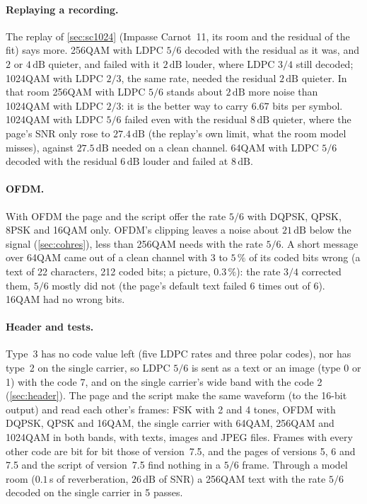 \documentclass[11pt,a4paper]{article}
\newcommand{\dB}{\,\mathrm{dB}}
\theoremstyle{remark}
\begin{document}
\paragraph{Replaying a recording.}
The replay of \cref{sec:sc1024} (Impasse Carnot~11, its room and the residual of the fit) says more. 256QAM with LDPC $5/6$ decoded with the residual as it was, and $2$ or $4\dB$ quieter, and failed with it $2\dB$ louder, where LDPC $3/4$ still decoded; 1024QAM with LDPC $2/3$, the same rate, needed the residual $2\dB$ quieter. In that room 256QAM with LDPC $5/6$ stands about $2\dB$ more noise than 1024QAM with LDPC $2/3$: it is the better way to carry $6.67$ bits per symbol. 1024QAM with LDPC $5/6$ failed even with the residual $8\dB$ quieter, where the page's SNR only rose to $27.4\dB$ (the replay's own limit, what the room model misses), against $27.5\dB$ needed on a clean channel. 64QAM with LDPC $5/6$ decoded with the residual $6\dB$ louder and failed at $8\dB$.

\paragraph{OFDM.}
With OFDM the page and the script offer the rate $5/6$ with DQPSK, QPSK, 8PSK and 16QAM only. OFDM's clipping leaves a noise about $21\dB$ below the signal (\cref{sec:cohres}), less than 256QAM needs with the rate $5/6$. A short message over 64QAM came out of a clean channel with 3 to $5\,\%$ of its coded bits wrong (a text of 22 characters, 212 coded bits; a picture, $0.3\,\%$): the rate $3/4$ corrected them, $5/6$ mostly did not (the page's default text failed 6 times out of 6). 16QAM had no wrong bits.

\paragraph{Header and tests.}
Type~3 has no code value left (five LDPC rates and three polar codes), nor has type~2 on the single carrier, so LDPC $5/6$ is sent as a text or an image (type 0 or 1) with the code 7, and on the single carrier's wide band with the code 2 (\cref{sec:header}). The page and the script make the same waveform (to the 16-bit output) and read each other's frames: FSK with 2 and 4 tones, OFDM with DQPSK, QPSK and 16QAM, the single carrier with 64QAM, 256QAM and 1024QAM in both bands, with texts, images and JPEG files. Frames with every other code are bit for bit those of version~7.5, and the pages of versions 5, 6 and 7.5 and the script of version~7.5 find nothing in a $5/6$ frame. Through a model room ($0.1$\,s of reverberation, $26\dB$ of SNR) a 256QAM text with the rate $5/6$ decoded on the single carrier in 5 passes.
\end{document}
